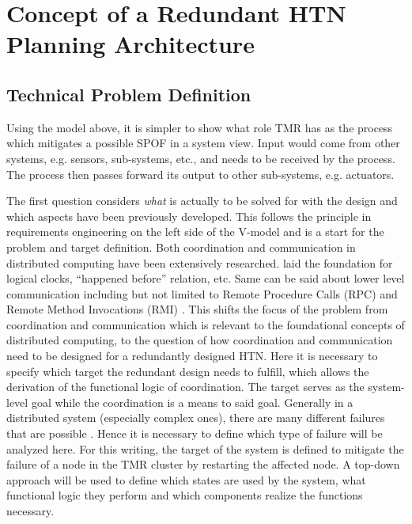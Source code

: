 \chapter{Concept of a Redundant HTN Planning Architecture}



\section{Technical Problem Definition}


Using the model above, it is simpler to show what role TMR has as the process which mitigates a possible SPOF in a system view. Input would come from other systems, e.g. sensors, sub-systems, etc., and needs to be received by the process. The process then passes forward its output to other sub-systems, e.g. actuators.

The first question considers \textit{what} is actually to be solved for with the design and which aspects have been previously developed. This follows the principle in requirements engineering on the left side of the V-model and is a start for the problem and target definition.
Both coordination and communication in distributed computing have been extensively researched. \textcite{lamport_time_1978} laid the foundation for logical clocks, ``happened before'' relation, etc. Same can be said about lower level communication including but not limited to Remote Procedure Calls (RPC) and Remote Method Invocations (RMI) \parencite{steen_distributed_2025}. This shifts the focus of the problem from coordination and communication which is relevant to the foundational concepts of distributed computing, to the question of how coordination and communication need to be designed for a redundantly designed HTN. Here it is necessary to specify which target the redundant design needs to fulfill, which allows the derivation of the functional logic of coordination. The target serves as the system-level goal while the coordination is a means to said goal. Generally in a distributed system (especially complex ones), there are many different failures that are possible \parencite{maurya_reliability_2020}. Hence it is necessary to define which type of failure will be analyzed here.
For this writing, the target of the system is defined to mitigate the failure of a node in the TMR cluster by restarting the affected node. A top-down approach will be used to define which states are used by the system, what functional logic they perform and which components realize the functions necessary.

